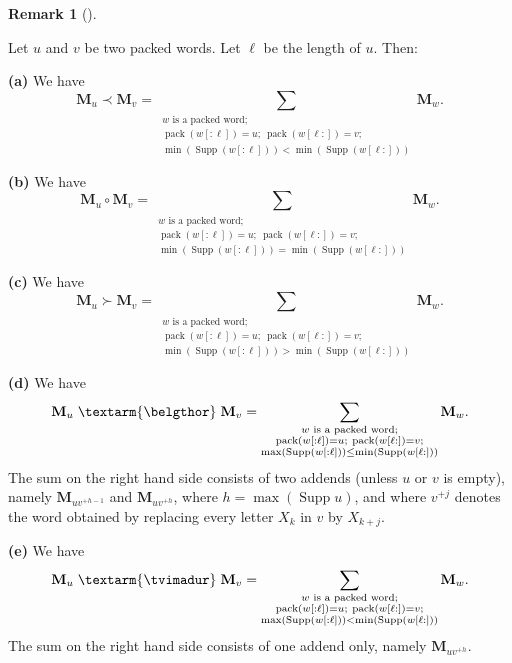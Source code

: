 \documentclass
[numbers=enddot,12pt,final,onecolumn,notitlepage,abstracton]{scrartcl}%
\theoremstyle{definition}
\newtheorem{remk}[theo]{Remark}
\newenvironment{remark}[1][]
{\begin{remk}[#1]\begin{leftbar}}
{\end{leftbar}\end{remk}}
\newcommand{\tvi}{\left. \textarm{\tvimadur} \right.}
\newcommand{\bel}{\left. \textarm{\belgthor} \right.}
\let\sumnonlimits\sum
\renewcommand{\sum}{\sumnonlimits\limits}
\begin{document}
\begin{remark}
\label{rmk.WQSym.closed}Let $u$ and $v$ be two packed words. Let $\ell$ be the
length of $u$. Then:

\textbf{(a)} We have%
\[
\mathbf{M}_{u}\left.  \prec\right.  \mathbf{M}_{v}=\sum_{\substack{w\text{ is
a packed word;}\\\operatorname*{pack}\left(  w\left[  :\ell\right]  \right)
=u;\ \operatorname*{pack}\left(  w\left[  \ell:\right]  \right)
=v;\\\min\left(  \operatorname*{Supp}\left(  w\left[  :\ell\right]  \right)
\right)  <\min\left(  \operatorname*{Supp}\left(  w\left[  \ell:\right]
\right)  \right)  }}\mathbf{M}_{w}.
\]


\textbf{(b)} We have%
\[
\mathbf{M}_{u}\circ\mathbf{M}_{v}=\sum_{\substack{w\text{ is a packed
word;}\\\operatorname*{pack}\left(  w\left[  :\ell\right]  \right)
=u;\ \operatorname*{pack}\left(  w\left[  \ell:\right]  \right)
=v;\\\min\left(  \operatorname*{Supp}\left(  w\left[  :\ell\right]  \right)
\right)  =\min\left(  \operatorname*{Supp}\left(  w\left[  \ell:\right]
\right)  \right)  }}\mathbf{M}_{w}.
\]


\textbf{(c)} We have%
\[
\mathbf{M}_{u}\left.  \succ\right.  \mathbf{M}_{v}=\sum_{\substack{w\text{ is
a packed word;}\\\operatorname*{pack}\left(  w\left[  :\ell\right]  \right)
=u;\ \operatorname*{pack}\left(  w\left[  \ell:\right]  \right)
=v;\\\min\left(  \operatorname*{Supp}\left(  w\left[  :\ell\right]  \right)
\right)  >\min\left(  \operatorname*{Supp}\left(  w\left[  \ell:\right]
\right)  \right)  }}\mathbf{M}_{w}.
\]


\textbf{(d)} We have%
\[
\mathbf{M}_{u} \bel \mathbf{M}_{v}=\sum_{\substack{w\text{ is a packed
word;}\\\operatorname*{pack}\left(  w\left[  :\ell\right]  \right)
=u;\ \operatorname*{pack}\left(  w\left[  \ell:\right]  \right)
=v;\\\max\left(  \operatorname*{Supp}\left(  w\left[  :\ell\right]  \right)
\right)  \leq\min\left(  \operatorname*{Supp}\left(  w\left[  \ell:\right]
\right)  \right)  }}\mathbf{M}_{w}.
\]
The sum on the right hand side consists of two addends (unless $u$ or $v$ is
empty), namely $\mathbf{M}_{uv^{+h-1}}$ and $\mathbf{M}_{uv^{+h}}$, where
$h=\max\left(  \operatorname*{Supp}u\right)  $, and where $v^{+j}$ denotes the
word obtained by replacing every letter $X_{k}$ in $v$ by $X_{k+j}$.

\textbf{(e)} We have%
\[
\mathbf{M}_{u} \tvi \mathbf{M}_{v}=\sum_{\substack{w\text{ is a packed
word;}\\\operatorname*{pack}\left(  w\left[  :\ell\right]  \right)
=u;\ \operatorname*{pack}\left(  w\left[  \ell:\right]  \right)
=v;\\\max\left(  \operatorname*{Supp}\left(  w\left[  :\ell\right]  \right)
\right)  <\min\left(  \operatorname*{Supp}\left(  w\left[  \ell:\right]
\right)  \right)  }}\mathbf{M}_{w}.
\]
The sum on the right hand side consists of one addend only, namely
$\mathbf{M}_{uv^{+h}}$.
\end{remark}
\end{document}

